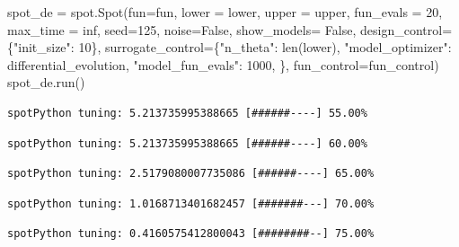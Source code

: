 \documentclass[
  letterpaper,
  DIV=11,
  numbers=noendperiod]{scrreprt}
\newenvironment{Shaded}{\begin{snugshade}}{\end{snugshade}}
\newcommand{\BuiltInTok}[1]{\textcolor[rgb]{0.00,0.23,0.31}{#1}}
\newcommand{\DecValTok}[1]{\textcolor[rgb]{0.68,0.00,0.00}{#1}}
\newcommand{\NormalTok}[1]{\textcolor[rgb]{0.00,0.23,0.31}{#1}}
\newcommand{\OperatorTok}[1]{\textcolor[rgb]{0.37,0.37,0.37}{#1}}
\newcommand{\StringTok}[1]{\textcolor[rgb]{0.13,0.47,0.30}{#1}}
\newcommand{\VariableTok}[1]{\textcolor[rgb]{0.07,0.07,0.07}{#1}}
\begin{document}
\begin{Shaded}
\begin{Highlighting}[]
\NormalTok{spot\_de }\OperatorTok{=}\NormalTok{ spot.Spot(fun}\OperatorTok{=}\NormalTok{fun,}
\NormalTok{                   lower }\OperatorTok{=}\NormalTok{ lower,}
\NormalTok{                   upper }\OperatorTok{=}\NormalTok{ upper,}
\NormalTok{                   fun\_evals }\OperatorTok{=} \DecValTok{20}\NormalTok{,}
\NormalTok{                   max\_time }\OperatorTok{=}\NormalTok{ inf,}
\NormalTok{                   seed}\OperatorTok{=}\DecValTok{125}\NormalTok{,}
\NormalTok{                   noise}\OperatorTok{=}\VariableTok{False}\NormalTok{,}
\NormalTok{                   show\_models}\OperatorTok{=} \VariableTok{False}\NormalTok{,}
\NormalTok{                   design\_control}\OperatorTok{=}\NormalTok{\{}\StringTok{"init\_size"}\NormalTok{: }\DecValTok{10}\NormalTok{\},}
\NormalTok{                   surrogate\_control}\OperatorTok{=}\NormalTok{\{}\StringTok{"n\_theta"}\NormalTok{: }\BuiltInTok{len}\NormalTok{(lower),}
                                      \StringTok{"model\_optimizer"}\NormalTok{: differential\_evolution,}
                                      \StringTok{"model\_fun\_evals"}\NormalTok{: }\DecValTok{1000}\NormalTok{,}
\NormalTok{                                      \},}
\NormalTok{                  fun\_control}\OperatorTok{=}\NormalTok{fun\_control)}
\NormalTok{spot\_de.run()}
\end{Highlighting}
\end{Shaded}

\begin{verbatim}
spotPython tuning: 5.213735995388665 [######----] 55.00% 
\end{verbatim}

\begin{verbatim}
spotPython tuning: 5.213735995388665 [######----] 60.00% 
\end{verbatim}

\begin{verbatim}
spotPython tuning: 2.5179080007735086 [######----] 65.00% 
\end{verbatim}

\begin{verbatim}
spotPython tuning: 1.0168713401682457 [#######---] 70.00% 
\end{verbatim}

\begin{verbatim}
spotPython tuning: 0.4160575412800043 [########--] 75.00% 
\end{verbatim}
\end{document}
